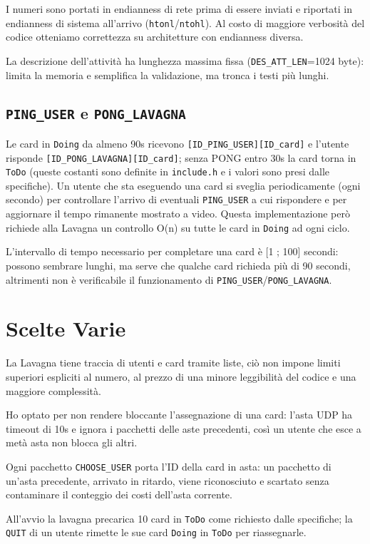 \documentclass[10pt,a4paper, titlepage]{article}
\begin{document}
I numeri sono portati in endianness di rete prima di essere inviati e riportati in endianness di sistema all'arrivo (\texttt{htonl}/\texttt{ntohl}). Al costo di maggiore verbosità del codice otteniamo correttezza su architetture con endianness diversa.

La descrizione dell'attività ha lunghezza massima fissa (\texttt{DES\_ATT\_LEN}=1024 byte): limita la memoria e semplifica la validazione, ma tronca i testi più lunghi.

\subsection*{\texttt{PING\_USER} e \texttt{PONG\_LAVAGNA}}
Le card in \texttt{Doing} da almeno 90s ricevono \texttt{[ID\_PING\_USER][ID\_card]} e l'utente risponde \texttt{[ID\_PONG\_LAVAGNA][ID\_card]};
senza PONG entro 30s la card torna in \texttt{ToDo} (queste costanti sono definite in \texttt{include.h} e i valori sono presi dalle specifiche).
Un utente che sta eseguendo una card si sveglia periodicamente (ogni secondo) per controllare l'arrivo di eventuali \texttt{PING\_USER} a cui rispondere e per aggiornare il tempo rimanente mostrato a video.
Questa implementazione però richiede alla Lavagna un controllo O(n) su tutte le card in \texttt{Doing} ad ogni ciclo.

L'intervallo di tempo necessario per completare una card è [1 ; 100] secondi: possono sembrare lunghi, ma serve che qualche card richieda più di 90 secondi, altrimenti non è verificabile il funzionamento di \texttt{PING\_USER}/\texttt{PONG\_LAVAGNA}.

\section*{Scelte Varie}
La Lavagna tiene traccia di utenti e card tramite liste, ciò non impone limiti superiori espliciti al numero, al prezzo di una minore leggibilità del codice e una maggiore complessità.

Ho optato per non rendere bloccante l'assegnazione di una card: l'asta UDP ha timeout di 10s e ignora i pacchetti delle aste precedenti, cos\`i un utente che esce a met\`a asta non blocca gli altri.

Ogni pacchetto \texttt{CHOOSE\_USER} porta l'ID della card in asta: un pacchetto di un'asta precedente, arrivato in ritardo, viene riconosciuto e scartato senza contaminare il conteggio dei costi dell'asta corrente.

All'avvio la lavagna precarica 10 card in \texttt{ToDo} come richiesto dalle specifiche; la \texttt{QUIT} di un utente rimette le sue card \texttt{Doing} in \texttt{ToDo} per riassegnarle.
\end{document}
